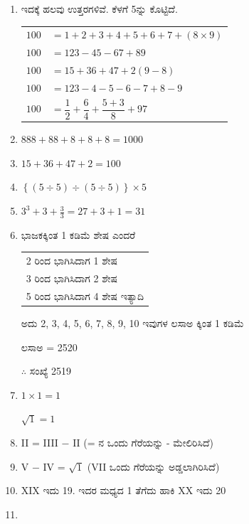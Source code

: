 \begin{enumerate}
\itemsep=5pt
\item ಇದಕ್ಕೆ ಹಲವು ಉತ್ತರಗಳಿವೆ. ಕೆಳಗೆ 5ನ್ನು ಕೊಟ್ಟಿದೆ.

\begin{tabular}{ll}
$100$ & $= 1 + 2 + 3 + 4 + 5 + 6 + 7 + (8 \times 9)$\\[0.1cm]
$100$ & $= 123 - 45 - 67 + 89$\\[0.1cm]
$100$ & $= 15 + 36 + 47 + 2 (9 - 8)$\\[0.1cm]
$100$ & $= 123 - 4 - 5 - 6 - 7 + 8 - 9$\\ [0.1cm]
$100$ & $= \dfrac{1}{2} + \dfrac{6}{4} + \dfrac{5 + 3}{8} + 97$
\end{tabular}

\smallskip
\item $888 + 88 + 8 + 8 + 8 = 1000$

\item $15 + 36 + 47 + 2 = 100$

\item $\left\{(5 \div 5) \div (5 \div 5)\right\} \times 5$

\item $3^{3} + 3 + \frac{3}{3} = 27 + 3 + 1 = 31$

\item ಭಾಜಕಕ್ಕಿಂತ 1 ಕಡಿಮೆ ಶೇಷ ಎಂದರೆ 

\begin{tabular}{l}
2 ರಿಂದ ಭಾಗಿಸಿದಾಗ 1 ಶೇಷ\\
3 ರಿಂದ ಭಾಗಿಸಿದಾಗ 2 ಶೇಷ\\
5 ರಿಂದ ಭಾಗಿಸಿದಾಗ 4 ಶೇಷ ಇತ್ಯಾದಿ
\end{tabular}

\smallskip
ಅದು 2, 3, 4, 5, 6, 7, 8, 9, 10 ಇವುಗಳ ಲಸಾಅ ಕ್ಕಿಂತ 1 ಕಡಿಮೆ 

\quad ಲಸಾಅ = 2520

$\therefore$ ಸಂಖ್ಯೆ  2519

\item $1 \times 1 = 1$

$\sqrt{1} = 1$

\item II = IIII $-$ II (= ನ ಒಂದು ಗೆರೆಯನ್ನು - ಮೇಲಿರಿಸಿದೆ)

\item V $-$ IV = $\sqrt{1}$ (VII ಒಂದು ಗೆರೆಯನ್ನು ಅಡ್ಡಲಾಗಿರಿಸಿದೆ)

\item XIX ಇದು 19. ಇದರ ಮಧ್ಯದ 1 ತೆಗೆದು ಹಾಕಿ XX ಇದು 20

\item 
~


\end{enumerate}
